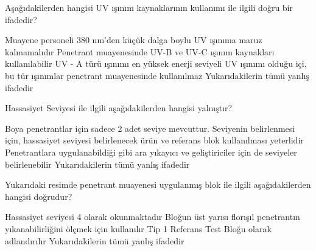 \begin{question}[subtitle=]
Aşağıdakilerden hangisi UV ışınım kaynaklarının kullanımı ile ilgili doğru bir ifadedir?
	\begin{tasks}
          \task Muayene personeli 380 nm’den küçük dalga boylu UV ışınıma maruz kalmamalıdır
          \task Penetrant muayenesinde UV-B ve UV-C ışınım kaynakları kullanılabilir
          \task UV - A türü ışınımı en yüksek enerji seviyeli UV ışınımı olduğu içi, bu tür ışınımlar penetrant muayenesinde kullanılmaz
          \task Yukarıdakilerin tümü yanlış ifadedir \correct
	\end{tasks}
\end{question}
\begin{solution}
	\correct
\end{solution}

\begin{question}[subtitle=]
Hassasiyet Seviyesi ile ilgili aşağıdakilerden hangisi yalnıştır?
	\begin{tasks}
          \task Boya penetrantlar için sadece 2 adet seviye mevcuttur.
          \task Seviyenin belirlenmesi için, hassasiyet seviyesi belirlenecek ürün ve referans blok kullanılması yeterlidir \correct
          \task Penetrantlara uygulanabildiği gibi ara yıkayıcı ve geliştiriciler için de seviyeler belirlenebilir
          \task Yukarıdakilerin tümü yanlış ifadedir
	\end{tasks}
\end{question}
\begin{solution}
	\correct
\end{solution}

\begin{question}[subtitle=]
  	\begin{figure}[!htb]
		\centering
		\fbox{\texttt{[image: refblok2]}}
	\end{figure}

Yukarıdaki resimde penetrant muayenesi uygulanmış blok ile ilgili aşağıdakilerden hangisi doğrudur?
	\begin{tasks}
          \task Hassasiyet seviyesi 4 olarak okunmaktadır
          \task Bloğun üst yarısı florışıl penetrantın yıkanabilirliğini ölçmek için kullanılır \correct
          \task Tip 1 Referans Test Bloğu olarak adlandırılır
          \task Yukarıdakilerin tümü yanlış ifadedir
	\end{tasks}
\end{question}
\begin{solution}
	\correct
\end{solution}

